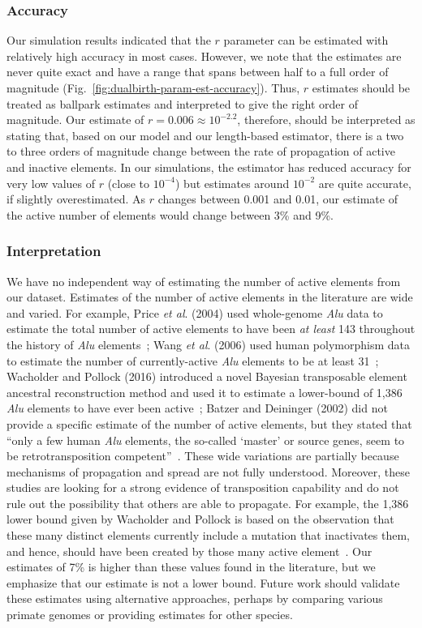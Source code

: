 \subsubsection{Accuracy}
Our simulation results indicated that the $r$ parameter can be estimated with relatively high accuracy in most cases. However, we note that the estimates are never quite exact and have a range that spans between half to a full order of magnitude (Fig.~\ref{fig:dualbirth-param-est-accuracy}). Thus, $r$ estimates should be treated as ballpark estimates and interpreted to give the right order of magnitude. Our estimate of $r=0.006\approx10^{-2.2}$, therefore, should be interpreted as stating that, based on our model and our length-based estimator, there is a two to three orders of magnitude change between the rate of propagation of active and inactive elements. In our simulations, the estimator has reduced accuracy for very low values of $r$ (close to $10^{-4}$) but estimates around $10^{-2}$ are quite accurate, if slightly overestimated. As $r$ changes between 0.001 and 0.01, our estimate of the active number of elements would change between 3\% and 9\%.

\subsubsection{Interpretation}
We have no independent way of estimating the number of active elements from our dataset. Estimates of the number of active elements in the literature are wide and varied. For example, Price \textit{et al}. (2004) used whole-genome {\em Alu} data to estimate the total number of active elements to have been {\em at least} 143 throughout the history of {\em Alu} elements~\cite{Price2004}; Wang \textit{et al}. (2006) used human polymorphism data to estimate the number of currently-active {\em Alu} elements to be at least 31~\cite{Wang2006}; Wacholder and Pollock (2016) introduced a novel Bayesian transposable element ancestral reconstruction method and used it to estimate a lower-bound of 1,386 {\em Alu} elements to have ever been active~\cite{Wacholder2016}; Batzer and Deininger (2002) did not provide a specific estimate of the number of active elements, but they stated that ``only a few human {\em Alu} elements, the so-called `master' or source genes, seem to be retrotransposition competent''~\cite{Batzer2002}. These wide variations are partially because mechanisms of propagation and spread are not fully understood. Moreover, these studies are looking for a strong evidence of transposition capability and do not rule out the possibility that others are able to propagate. For example,  the 1,386 lower bound given by Wacholder and Pollock is based on the observation that these many distinct elements currently include a mutation that inactivates them, and hence, should have been created by those many active element~\cite{Wacholder2016}. Our estimates of 7\% is higher than these values found in the literature, but we emphasize that our estimate is not a lower bound. Future work should validate these estimates using alternative approaches, perhaps by comparing various primate genomes or providing estimates for other species.

